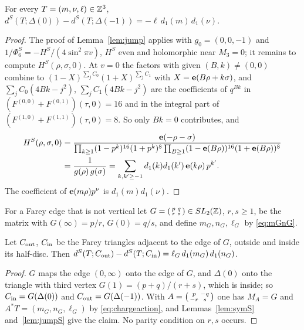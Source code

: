 \begin{lemma}\label{lem:jumpS}
For every $T=(m,\nu,\ell)\in\mathbb{Z}^3$, $d^S(T;\Delta(0))-d^S(T;\Delta(-1))=-\ell\,d_1(m)\,d_1(\nu)$.
\end{lemma}

\begin{proof}
The proof of Lemma~\ref{lem:jump} applies with $g_0=(0,0,-1)$ and $1/\Phi^S_6=-H^S/(4\sin^2\pi v)$, $H^S$ even and holomorphic near $M_3=0$; it remains to compute $H^S(\rho,\sigma,0)$. At $v=0$ the factors with given $(B,k)\ne(0,0)$ combine to $(1-X)^{\sum_jC_0}(1+X)^{\sum_jC_1}$ with $X=\mathbf e(B\rho+k\sigma)$, and $\sum_jC_0(4Bk-j^2)$, $\sum_jC_1(4Bk-j^2)$ are the coefficients of $q^{Bk}$ in $(F^{(0,0)}+F^{(0,1)})(\tau,0)=16$ and in the integral part of $(F^{(1,0)}+F^{(1,1)})(\tau,0)=8$. So only $Bk=0$ contributes, and
\begin{align*}
H^S(\rho,\sigma,0)&=\frac{\mathbf e(-\rho-\sigma)}{\prod_{k\ge1}(1-p^k)^{16}(1+p^k)^8\prod_{B\ge1}(1-\mathbf e(B\rho))^{16}(1+\mathbf e(B\rho))^8}\\
&=\frac1{g(\rho)\,g(\sigma)}=\sum_{k,k'\ge-1}d_1(k)d_1(k')\,\mathbf e(k\rho)\,p^{k'}.
\end{align*}
The coefficient of $\mathbf e(m\rho)p^\nu$ is $d_1(m)d_1(\nu)$.
\end{proof}

For a Farey edge that is not vertical let $G=\begin{psmallmatrix}p&q\\r&s\end{psmallmatrix}\in SL_2(\mathbb{Z})$, $r,s\ge1$, be the matrix with $G(\infty)=p/r$, $G(0)=q/s$, and define $m_G,n_G,\ell_G$ by \eqref{eq:mGnG}.

\begin{corollary}\label{cor:transportS}
Let $C_{\rm out}$, $C_{\rm in}$ be the Farey triangles adjacent to the edge of $G$, outside and inside its half-disc. Then $d^S(T;C_{\rm out})-d^S(T;C_{\rm in})=\ell_G\,d_1(m_G)\,d_1(n_G)$.
\end{corollary}

\begin{proof}
$G$ maps the edge $(0,\infty)$ onto the edge of $G$, and $\Delta(0)$ onto the triangle with third vertex $G(1)=(p+q)/(r+s)$, which is inside; so $C_{\rm in}=G(\Delta(0))$ and $C_{\rm out}=G(\Delta(-1))$. With $A=\begin{psmallmatrix}p&-q\\-r&s\end{psmallmatrix}$ one has $M_A=G$ and $A^\ast T=(m_G,n_G,\ell_G)$ by \eqref{eq:chargeaction}, and Lemmas~\ref{lem:symS} and~\ref{lem:jumpS} give the claim. No parity condition on $r,s$ occurs.
\end{proof}

